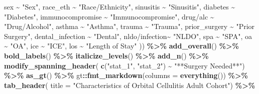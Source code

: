 \documentclass[
]{article}
\newenvironment{Shaded}{\begin{snugshade}}{\end{snugshade}}
\newcommand{\AttributeTok}[1]{\textcolor[rgb]{0.13,0.29,0.53}{#1}}
\newcommand{\FunctionTok}[1]{\textcolor[rgb]{0.13,0.29,0.53}{\textbf{#1}}}
\newcommand{\NormalTok}[1]{#1}
\newcommand{\SpecialCharTok}[1]{\textcolor[rgb]{0.81,0.36,0.00}{\textbf{#1}}}
\newcommand{\StringTok}[1]{\textcolor[rgb]{0.31,0.60,0.02}{#1}}
\begin{document}
\begin{Shaded}
\begin{Highlighting}[]
\NormalTok{      sex }\SpecialCharTok{\textasciitilde{}} \StringTok{"Sex"}\NormalTok{,}
\NormalTok{      race\_eth }\SpecialCharTok{\textasciitilde{}} \StringTok{"Race/Ethnicity"}\NormalTok{,}
\NormalTok{      sinusitis }\SpecialCharTok{\textasciitilde{}} \StringTok{"Sinusitis"}\NormalTok{,}
\NormalTok{      diabetes }\SpecialCharTok{\textasciitilde{}} \StringTok{"Diabetes"}\NormalTok{,}
\NormalTok{      immunocompromise }\SpecialCharTok{\textasciitilde{}} \StringTok{"Immunocompromise"}\NormalTok{,}
      \StringTok{\textasciigrave{}}\AttributeTok{drug/alc}\StringTok{\textasciigrave{}} \SpecialCharTok{\textasciitilde{}} \StringTok{"Drug/Alcohol"}\NormalTok{,}
\NormalTok{      asthma }\SpecialCharTok{\textasciitilde{}} \StringTok{"Asthma"}\NormalTok{,}
\NormalTok{      trauma }\SpecialCharTok{\textasciitilde{}} \StringTok{"Trauma"}\NormalTok{,}
\NormalTok{      prior\_surgery }\SpecialCharTok{\textasciitilde{}} \StringTok{"Prior Surgery"}\NormalTok{,}
\NormalTok{      dental\_infection }\SpecialCharTok{\textasciitilde{}} \StringTok{"Dental"}\NormalTok{,}
      \StringTok{\textasciigrave{}}\AttributeTok{nldo/infection}\StringTok{\textasciigrave{}}\SpecialCharTok{\textasciitilde{}} \StringTok{"NLDO"}\NormalTok{,}
\NormalTok{      spa }\SpecialCharTok{\textasciitilde{}} \StringTok{"SPA"}\NormalTok{,}
\NormalTok{      oa }\SpecialCharTok{\textasciitilde{}} \StringTok{"OA"}\NormalTok{,}
\NormalTok{      ice }\SpecialCharTok{\textasciitilde{}} \StringTok{"ICE"}\NormalTok{,}
\NormalTok{      los }\SpecialCharTok{\textasciitilde{}} \StringTok{"Length of Stay"}
\NormalTok{      )) }\SpecialCharTok{\%\textgreater{}\%}
  \FunctionTok{add\_overall}\NormalTok{() }\SpecialCharTok{\%\textgreater{}\%} \FunctionTok{bold\_labels}\NormalTok{() }\SpecialCharTok{\%\textgreater{}\%} \FunctionTok{italicize\_levels}\NormalTok{() }\SpecialCharTok{\%\textgreater{}\%} \FunctionTok{add\_n}\NormalTok{() }\SpecialCharTok{\%\textgreater{}\%}
  \FunctionTok{modify\_spanning\_header}\NormalTok{(}
    \FunctionTok{c}\NormalTok{(}\StringTok{"stat\_1"}\NormalTok{, }\StringTok{"stat\_2"}\NormalTok{) }\SpecialCharTok{\textasciitilde{}} \StringTok{"**Surgery Needed**"}\NormalTok{) }\SpecialCharTok{\%\textgreater{}\%}
  \FunctionTok{as\_gt}\NormalTok{() }\SpecialCharTok{\%\textgreater{}\%}
\NormalTok{  gt}\SpecialCharTok{::}\FunctionTok{fmt\_markdown}\NormalTok{(}\AttributeTok{columns =} \FunctionTok{everything}\NormalTok{()) }\SpecialCharTok{\%\textgreater{}\%}
  \FunctionTok{tab\_header}\NormalTok{(}
    \AttributeTok{title =} \StringTok{"Characteristics of Orbital Cellulitis Adult Cohort"}\NormalTok{) }\SpecialCharTok{\%\textgreater{}\%} 

\end{Highlighting}
\end{Shaded}
\end{document}
